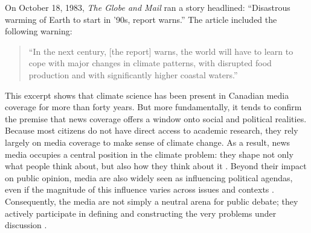 \documentclass[12pt]{article}
\renewcommand\_{\texttt{\detokenize{_}\allowbreak}}
\begin{document}
On October 18, 1983, \textit{The Globe and Mail} ran a story headlined: “Disastrous warming of Earth to start in ’90s, report warns.” The article included the following warning:
\begin{quote}
“In the next century, [the report] warns, the world will have to learn to cope with major changes in climate patterns, with disrupted food production and with significantly higher coastal waters.”
\end{quote}
This excerpt shows that climate science has been present in Canadian media coverage for more than forty years. But more fundamentally, it tends to confirm the premise that news coverage offers a window onto social and political realities. Because most citizens do not have direct access to academic research, they rely largely on media coverage to make sense of climate change. As a result, news media occupies a central position in the climate problem: they shape not only what people think about, but also how they think about it \autocite{scheufele_framing_2007}. Beyond their impact on public opinion, media are also widely seen as influencing political agendas, even if the magnitude of this influence varies across issues and contexts \autocite{walgrave_contingency_2006}. Consequently, the media are not simply a neutral arena for public debate; they actively participate in defining and constructing the very problems under discussion \autocite{cohen_folk_1972, trevino_media_2018}.
\end{document}
